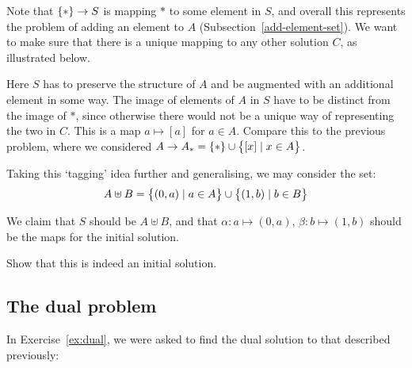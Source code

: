 Note that $\{ \ast \} \to S$ is mapping $\ast$ to some element in $S$, and
overall this represents the problem of adding an element to $A$
(Subsection~\ref{add-element-set}). We want to make sure that there is a unique
mapping to any other solution $C$, as illustrated below.

\begin{center}
\end{center}

Here $S$ has to preserve the structure of $A$ and be augmented with an
additional element in some way. The image of elements of $A$ in $S$ have to be
distinct from the image of $\ast$, since otherwise there would not be a unique
way of representing the two in $C$. This is a map $a \mapsto [a]$ for $a \in A$.
Compare this to the previous problem, where we considered
$A \to A_\ast = \{ \ast \} \cup \big\{ [x] \mid x \in A \big\}$.

Taking this `tagging' idea further and generalising, we may consider the set:
\begin{equation*}
A \uplus B = \big\{ (0, a) \mid a \in A \big\} \cup
\big\{ (1, b) \mid b \in B \big\}
\end{equation*}

We claim that $S$ should be $A \uplus B$, and that $\alpha: a \mapsto (0, a)$,
$\beta: b \mapsto (1, b)$ should be the maps for the initial solution.

\begin{exercise}
Show that this is indeed an initial solution.
\end{exercise}

\subsection{The dual problem}

In Exercise~\ref{ex:dual}, we were asked to find the dual solution to that
described previously:
\begin{center}
\end{center}

